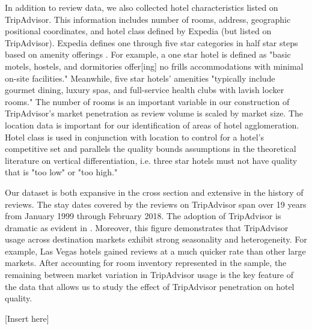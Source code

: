 \documentclass[mksc,blindrev]{informs3} %
\begin{document}
In addition to review data, we also collected hotel characteristics listed on TripAdvisor. This information includes number of rooms, address, geographic positional coordinates, and hotel class defined by Expedia (but listed on TripAdvisor). Expedia defines one through five star categories in half star steps based on amenity offerings \citep{expedia2018ratings}. For example, a one star hotel is defined as "basic motels, hostels, and dormitories offer[ing] no frills accommodations with minimal on-site facilities." Meanwhile, five star hotels' amenities "typically include gourmet dining, luxury spas, and full-service health clubs with lavish locker rooms." The number of rooms is an important variable in our construction of TripAdvisor's market penetration as review volume is scaled by market size. The location data is important for our identification of areas of hotel agglomeration. Hotel class is used in conjunction with location to control for a hotel's competitive set and parallels the quality bounds assumptions in the theoretical literature on vertical differentiation, i.e. three star hotels must not have quality that is "too low" or "too high."

Our dataset is both expansive in the cross section and extensive in the history of reviews. The stay dates covered by the reviews on TripAdvisor span over 19 years from January 1999 through February 2018. The adoption of TripAdvisor is dramatic as evident in . Moreover, this figure demonstrates that TripAdvisor usage across destination markets exhibit strong seasonality and heterogeneity. For example, Las Vegas hotels gained reviews at a much quicker rate than other large markets. After accounting for room inventory represented in the sample, the remaining between market variation in TripAdvisor usage is the key feature of the data that allows us to study the effect of TripAdvisor penetration on hotel quality. 

[Insert  here]

\end{document}
